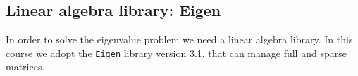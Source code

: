 \subsection*{Linear algebra library: Eigen}

In order to solve the eigenvalue problem we need a linear algebra library. In
this course we adopt the \texttt{Eigen} library version 3.1, that can manage
full and sparse matrices.
